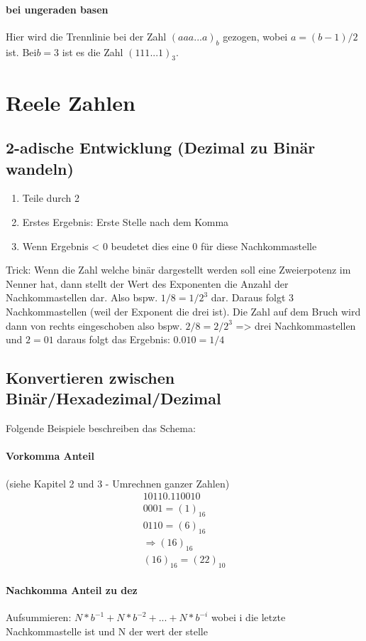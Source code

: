 \documentclass[a4paper]{article}
\begin{document}
\paragraph{bei ungeraden basen}
Hier wird die Trennlinie bei der Zahl $(aaa...a)_b$ gezogen, wobei $a=(b-1)/2$ ist. Bei$ b=3$ ist es die Zahl $(111...1)_3$.
\section{Reele Zahlen}
\subsection{2-adische Entwicklung (Dezimal zu Binär wandeln)}
\begin{enumerate} 
\item Teile durch 2
\item Erstes Ergebnis: Erste Stelle nach dem Komma 
\item Wenn Ergebnis < 0 beudetet dies eine 0 für diese Nachkommastelle
\end{enumerate}
Trick: Wenn die Zahl welche binär dargestellt werden soll eine Zweierpotenz im Nenner hat, dann stellt der Wert des Exponenten die Anzahl der Nachkommastellen dar. Also bspw. $ 1/8 = 1/2^3 $ dar. Daraus folgt 3 Nachkommastellen (weil der Exponent die drei ist). Die Zahl auf dem Bruch wird dann von rechts eingeschoben also bspw. $2/8 = 2/2^3 $ => drei Nachkommastellen und $ 2 = 01 $ daraus folgt das Ergebnis: $ 0.010 = 1/4$


\subsection{Konvertieren zwischen Binär/Hexadezimal/Dezimal}
Folgende Beispiele beschreiben das Schema:

\paragraph{Vorkomma Anteil} (siehe Kapitel 2 und 3 - Umrechnen ganzer Zahlen)
\begin{eqnarray}
10110.110010 \\
0001 = (1)_{16} \\
0110 = (6)_{16}\\
\Rightarrow (16)_{16} \\
(16)_{16} = (22)_{10}
\end{eqnarray}

\paragraph{Nachkomma Anteil zu dez}
Aufsummieren:
$N*b^{-1}+N*b^{-2}+...+N*b^{-i} $ wobei i die letzte Nachkommastelle ist und N der wert der stelle
\end{document}
